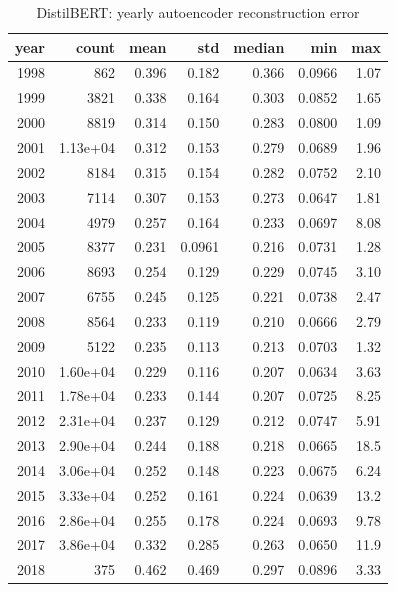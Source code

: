 \begin{table}[ht]
\centering
\caption{DistilBERT: yearly autoencoder reconstruction error}
\label{tab:distilbert_ae_all_years}
\begin{tabular}{rrrrrrr}
\toprule
year & count & mean & std & median & min & max \\
\midrule
1998 & 862 & 0.396 & 0.182 & 0.366 & 0.0966 & 1.07 \\
1999 & 3821 & 0.338 & 0.164 & 0.303 & 0.0852 & 1.65 \\
2000 & 8819 & 0.314 & 0.150 & 0.283 & 0.0800 & 1.09 \\
2001 & 1.13e+04 & 0.312 & 0.153 & 0.279 & 0.0689 & 1.96 \\
2002 & 8184 & 0.315 & 0.154 & 0.282 & 0.0752 & 2.10 \\
2003 & 7114 & 0.307 & 0.153 & 0.273 & 0.0647 & 1.81 \\
2004 & 4979 & 0.257 & 0.164 & 0.233 & 0.0697 & 8.08 \\
2005 & 8377 & 0.231 & 0.0961 & 0.216 & 0.0731 & 1.28 \\
2006 & 8693 & 0.254 & 0.129 & 0.229 & 0.0745 & 3.10 \\
2007 & 6755 & 0.245 & 0.125 & 0.221 & 0.0738 & 2.47 \\
2008 & 8564 & 0.233 & 0.119 & 0.210 & 0.0666 & 2.79 \\
2009 & 5122 & 0.235 & 0.113 & 0.213 & 0.0703 & 1.32 \\
2010 & 1.60e+04 & 0.229 & 0.116 & 0.207 & 0.0634 & 3.63 \\
2011 & 1.78e+04 & 0.233 & 0.144 & 0.207 & 0.0725 & 8.25 \\
2012 & 2.31e+04 & 0.237 & 0.129 & 0.212 & 0.0747 & 5.91 \\
2013 & 2.90e+04 & 0.244 & 0.188 & 0.218 & 0.0665 & 18.5 \\
2014 & 3.06e+04 & 0.252 & 0.148 & 0.223 & 0.0675 & 6.24 \\
2015 & 3.33e+04 & 0.252 & 0.161 & 0.224 & 0.0639 & 13.2 \\
2016 & 2.86e+04 & 0.255 & 0.178 & 0.224 & 0.0693 & 9.78 \\
2017 & 3.86e+04 & 0.332 & 0.285 & 0.263 & 0.0650 & 11.9 \\
2018 & 375 & 0.462 & 0.469 & 0.297 & 0.0896 & 3.33 \\
\bottomrule
\end{tabular}
\end{table}

